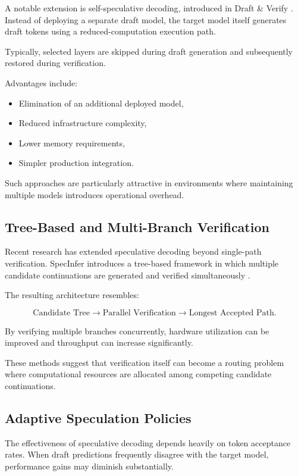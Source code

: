\documentclass[11pt,a4paper]{article}
\begin{document}
A notable extension is self-speculative decoding, introduced in Draft \& Verify \cite{zhang2023draftverify}. Instead of deploying a separate draft model, the target model itself generates draft tokens using a reduced-computation execution path.

Typically, selected layers are skipped during draft generation and subsequently restored during verification.

Advantages include:

\begin{itemize}
\item Elimination of an additional deployed model,
\item Reduced infrastructure complexity,
\item Lower memory requirements,
\item Simpler production integration.
\end{itemize}

Such approaches are particularly attractive in environments where maintaining multiple models introduces operational overhead.

\subsection{Tree-Based and Multi-Branch Verification}

Recent research has extended speculative decoding beyond single-path verification. SpecInfer introduces a tree-based framework in which multiple candidate continuations are generated and verified simultaneously \cite{miao2024specinfer}.

The resulting architecture resembles:

\[
\text{Candidate Tree}
\rightarrow
\text{Parallel Verification}
\rightarrow
\text{Longest Accepted Path}.
\]

By verifying multiple branches concurrently, hardware utilization can be improved and throughput can increase significantly.

These methods suggest that verification itself can become a routing problem where computational resources are allocated among competing candidate continuations.

\subsection{Adaptive Speculation Policies}

The effectiveness of speculative decoding depends heavily on token acceptance rates. When draft predictions frequently disagree with the target model, performance gains may diminish substantially.
\end{document}
